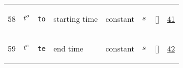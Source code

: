 \begin{longtable}{|p{1cm}|p{3cm}|p{3cm}|p{7cm}|p{3.0cm}|p{3cm}|p{2cm}|p{1cm}|}
                 \\
    58
             & \hypertarget{"v:58"}{ $ {t^{o}}_{} $}
             & \verb|to|
             & starting time
             & \begin{lay}constant \end{lay}
             & $ s \, $
             & []
             & \hyperlink{"e:41"}{ 41 }
                 \\
    59
             & \hypertarget{"v:59"}{ $ {t^{e}}_{} $}
             & \verb|te|
             & end time
             & \begin{lay}constant \end{lay}
             & $ s \, $
             & []
             & \hyperlink{"e:42"}{ 42 }
                 \\
    \end{longtable}